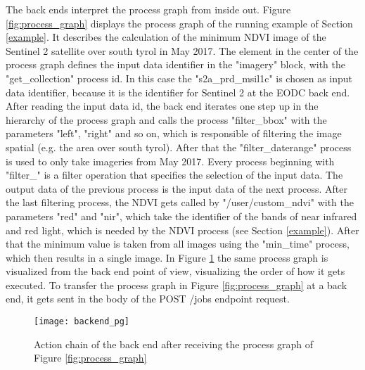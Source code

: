 \documentclass[draft,final]{vutinfth} %
\begin{document}
The back ends interpret the process graph from inside out. Figure \ref{fig:process_graph} displays the process graph of the running example of Section \ref{example}. It describes the calculation of the minimum NDVI image of the Sentinel 2 satellite over south tyrol in May 2017. The element in the center of the process graph defines the input data identifier in the "imagery" block, with the "get\_collection" process id. In this case the "s2a\_prd\_msil1c" is chosen as input data identifier, because it is the identifier for Sentinel 2 at the EODC back end. After reading the input data id, the back end iterates one step up in the hierarchy of the process graph and calls the process "filter\_bbox" with the parameters "left", "right" and so on, which is responsible of filtering the image spatial (e.g. the area over south tyrol). After that the "filter\_daterange" process is used to only take imageries from May 2017. Every process beginning with "filter\_" is a filter operation that specifies the selection of the input data. The output data of the previous process is the input data of the next process. After the last filtering process, the NDVI gets called by "/user/custom\_ndvi" with the parameters "red" and "nir", which take the identifier of the bands of near infrared and red light, which is needed by the NDVI process (see Section \ref{example}). After that the minimum value is taken from all images using the "min\_time" process, which then results in a single image. In Figure \ref{fig:process_graph_diagram} the same process graph is visualized from the back end point of view, visualizing the order of how it gets executed. To transfer the process graph in Figure \ref{fig:process_graph} at a back end, it gets sent in the body of the POST /jobs endpoint request.

\begin{figure}[h]
	\centering
	\texttt{[image: backend\_pg]}
	\caption{Action chain of the back end after receiving the process graph of Figure \ref{fig:process_graph}}
	\label{fig:process_graph_diagram} %
\end{figure}
\end{document}
